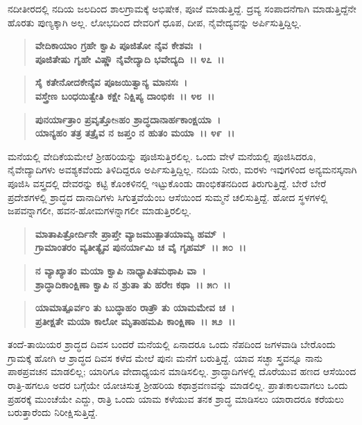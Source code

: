 ನದೀತೀರದಲ್ಲಿ ನದಿಯ ಜಲದಿಂದ ಶಾಲಗ್ರಾಮಕ್ಕೆ ಅಭಿಷೇಕ, ಪೂಜೆ ಮಾಡುತ್ತಿದ್ದೆ. ದ್ರವ್ಯ ಸಂಪಾದನೆಗಾಗಿ ಮಾಡುತ್ತಿದ್ದೆನೇ ಹೊರತು ಪುಣ್ಯಕ್ಕಾಗಿ ಅಲ್ಲ. ಲೋಭದಿಂದ ದೇವರಿಗೆ ಧೂಪ, ದೀಪ, ನೈವೇದ್ಯವನ್ನು ಅರ್ಪಿಸುತ್ತಿದ್ದಿಲ್ಲ.

\begin{verse}
\textbf{ವೇದಿಕಾಯಾಂ ಗ್ರಹೇ ಕ್ವಾಪಿ ಪೂಜಿತೋ ನೈವ ಕೇಶವಃ~।}\\\textbf{ಪೂಜಿತೇಷು ಗೃಹೇ ವಿಷ್ಣೌ ನೈವೇದ್ಯಾದಿ ಭವೇದ್ಯದಿ~।। ೪೭~।। }
\end{verse}

\begin{verse}
\textbf{ಸೈ ಕತೇನೋದಕೇನೈವ ಪೂಜಯಿತ್ವಾನ್ಯ ಮಾನಸಃ~।}\\\textbf{ವಸ್ತ್ರೇಣ ಬಂಧಯಿತ್ವೇತಿ ಕಕ್ಷೇ ನಿಕ್ಷಿಪ್ಯ ದಾಂಭಿಕಃ~।। ೪೮~।। }
\end{verse}

\begin{verse}
\textbf{ಪುನರ್ಯಾತ್ರಾಂ ಪ್ರವೃತ್ತೋsಹಂ ಶ್ರಾದ್ಧದಾನಾರ್ಹಕಾಂಕ್ಷಯಾ~।}\\\textbf{ಯಾನ್ಯಹಂ ತತ್ರ ತತ್ರೈವ ನ ಜಪ್ತಂ ನ ಹುತಂ ಮಯಾ~।। ೪೯~।।}
\end{verse}

ಮನೆಯಲ್ಲಿ ವೇದಿಕೆಯಮೇಲೆ ಶ‍್ರೀಹರಿಯನ್ನು ಪೂಜಿಸುತ್ತಿರಲಿಲ್ಲ. ಒಂದು ವೇಳೆ ಮನೆಯಲ್ಲಿ ಪೂಜಿಸಿದರೂ, ನೈವೇದ್ಯಾದಿಗಳು ಅವಶ್ಯಕವೆಂದು ತಿಳಿದಿದ್ದರೂ ಅರ್ಪಿಸುತ್ತಿದ್ದಿಲ್ಲ. ನದಿಯ ನೀರು, ಮರಳು ಇವುಗಳಿಂದ ಅನ್ಯಮನಸ್ಕನಾಗಿ ಪೂಜಿಸಿ ವಸ್ತ್ರದಲ್ಲಿ ದೇವರನ್ನು ಕಟ್ಟಿ ಕೊಂಕಳಿನಲ್ಲಿ ಇಟ್ಟುಕೊಂಡು ಡಾಂಭಿಕತನದಿಂದ ತಿರುಗುತ್ತಿದ್ದೆ. ಬೇರೆ ಬೇರೆ ಪ್ರದೇಶಗಳಲ್ಲಿ ಶ್ರಾದ್ಧದ ದಾನಾದಿಗಳು ಸಿಗುತ್ತವೆಯೆಂಬ ಆಸೆಯಿಂದ ಸುಮ್ಮನೆ ಚಲಿಸುತ್ತಿದ್ದೆ. ಹೋದ ಸ್ಥಳಗಳಲ್ಲಿ ಜಪವನ್ನಾಗಲೀ, ಹವನ-ಹೋಮಗಳನ್ನಾಗಲೀ ಮಾಡುತ್ತಿರಲಿಲ್ಲ.

\begin{verse}
\textbf{ಮಾತಾಪಿತ್ರೋರ್ದಿನೇ ಪ್ರಾಪ್ತೇ ವ್ಯಾಜಮುತ್ಪಾತಯಾಮ್ಯ ಹಮ್~।}\\\textbf{ಗ್ರಾಮಾಂತರಂ ವ್ಯತೀತ್ಯೈವ ಪುನರ್ಯಾಮಿ ಚ ವೈ ಗೃಹಮ್~।। ೫೦~।।} 
\end{verse}

\begin{verse}
\textbf{ನ ವ್ಯಾಖ್ಯಾತಂ ಮಯಾ ಕ್ವಾಪಿ ನಾಧ್ಯಾಪಿತಮಥಾಪಿ ವಾ~।}\\\textbf{ಶ್ರಾದ್ಧಾದಿಕಾಂಕ್ಷಿಣಾ ಕ್ವಾಪಿ ನ ಶ್ರುತಾ ತು ಹರೇಃ ಕಥಾ~।। ೫೧~।। }
\end{verse}

\begin{verse}
\textbf{ಯಾಮಾತ್ಪೂರ್ವಂ ತು ಬುದ್ಧಾಹಂ ರಾತ್ರೌ ತು ಯಾಮಮೇವ ಚ~।}\\\textbf{ಪ್ರತೀಕ್ಷತೇ ಮಯಾ ಕಾಲೋ ಮೃತಾಹಮಪಿ ಕಾಂಕ್ಷಿಣಾ~।। ೫೨~।।}
\end{verse}

ತಂದೆ-ತಾಯಿಯರ ಶ್ರಾದ್ಧದ ದಿವಸ ಬಂದರೆ ಮನೆಯಲ್ಲಿ ಏನಾದರೂ ಒಂದು ನೆಪದಿಂದ ಜಗಳವಾಡಿ ಬೇರೊಂದು ಗ್ರಾಮಕ್ಕೆ ಹೋಗಿ ಆ ಶ್ರಾದ್ಧದ ದಿವಸ ಕಳೆದ ಮೇಲೆ ಪುನಃ ಮನೆಗೆ ಬರುತ್ತಿದ್ದೆ. ಯಾವ ಸಚ್ಛಾ ಸ್ತ್ರವನ್ನೂ ನಾನು ಪಾಠಪ್ರವಚನ ಮಾಡಲಿಲ್ಲ; ಯಾರಿಗೂ ವೇದಾಧ್ಯಯನ ಮಾಡಿಸಲಿಲ್ಲ. ಶ್ರಾದ್ಧಾದಿಗಳಲ್ಲಿ ದೊರೆಯುವ ಹಣದ ಆಸೆಯಿಂದ ರಾತ್ರಿ-ಹಗಲೂ ಅದರ ಬಗ್ಗೆಯೇ ಯೋಚಿಸುತ್ತ ಶ‍್ರೀಹರಿಯ ಕಥಾಶ್ರವಣವನ್ನು ಮಾಡಲಿಲ್ಲ. ಪ್ರಾತಃಕಾಲವಾಗಲು ಒಂದು ಪ್ರಹರಕ್ಕೆ ಮುಂಚೆಯೇ ಎದ್ದು, ರಾತ್ರಿ ಒಂದು ಯಾಮ ಕಳೆಯುವ ತನಕ ಶ್ರಾದ್ಧ ಮಾಡಿಸಲು ಯಾರಾದರೂ ಕರೆಯಲು ಬರುತ್ತಾರೆಂದು ನಿರೀಕ್ಷಿಸುತ್ತಿದ್ದೆ.

